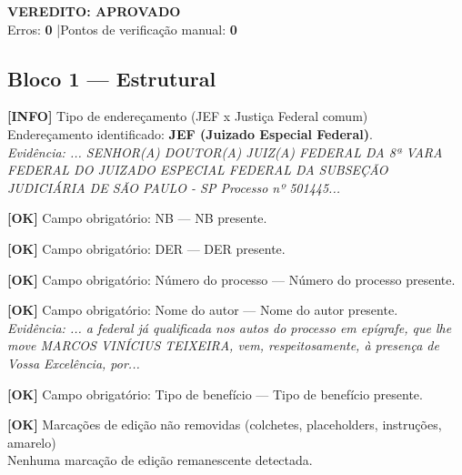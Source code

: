\documentclass[12pt,a4paper]{article}
\newcommand{\statusOK}[1]{\textcolor{corOK}{\textbf{[OK]}} #1}
\newcommand{\statusINFO}[1]{\textcolor{corINFO}{\textbf{[INFO]}} #1}
\begin{document}
\vspace{0.5em}

\noindent\colorbox{corFundoAprovado}{%
  \begin{minipage}{\dimexpr\linewidth-2\fboxsep}
    \centering
    \vspace{0.3em}
    {\large \textcolor{corOK}{\textbf{VEREDITO: APROVADO}}}\\
    Erros: \textbf{0} \quad|\quad Pontos de verificação manual: \textbf{0}
    \vspace{0.3em}
  \end{minipage}%
}

\vspace{1em}


\subsection{Bloco 1 --- Estrutural}

\statusINFO{Tipo de endereçamento (JEF x Justiça Federal comum)}\\
Endereçamento identificado: \textbf{JEF (Juizado Especial Federal)}.\\
\textit{Evidência: ... SENHOR(A) DOUTOR(A) JUIZ(A) FEDERAL DA 8ª VARA FEDERAL DO JUIZADO ESPECIAL FEDERAL DA SUBSEÇÃO JUDICIÁRIA DE SÃO PAULO - SP Processo nº 501445...}

\medskip
\statusOK{Campo obrigatório: NB} --- NB presente.

\medskip
\statusOK{Campo obrigatório: DER} --- DER presente.

\medskip
\statusOK{Campo obrigatório: Número do processo} --- Número do processo presente.

\medskip
\statusOK{Campo obrigatório: Nome do autor} --- Nome do autor presente.\\
\textit{Evidência: ... a federal já qualificada nos autos do processo em epígrafe, que lhe move MARCOS VINÍCIUS TEIXEIRA, vem, respeitosamente, à presença de Vossa Excelência, por...}

\medskip
\statusOK{Campo obrigatório: Tipo de benefício} --- Tipo de benefício presente.

\medskip
\statusOK{Marcações de edição não removidas (colchetes, placeholders, instruções, amarelo)}\\
Nenhuma marcação de edição remanescente detectada.
\end{document}
